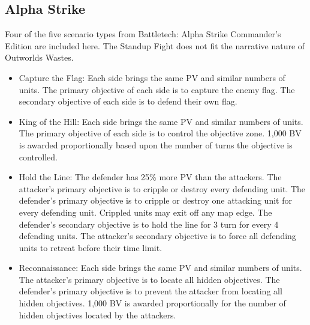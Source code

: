 \documentclass[UTF8]{article}
\begin{document}
\subsection{Alpha Strike}

Four of the five scenario types from Battletech: Alpha Strike Commander's Edition are included here.
The Standup Fight does not fit the narrative nature of Outworlds Wastes.

\begin{itemize}

\item Capture the Flag: Each side brings the same PV and similar numbers of units.
The primary objective of each side is to capture the enemy flag.
The secondary objective of each side is to defend their own flag.

\item King of the Hill: Each side brings the same PV and similar numbers of units.
The primary objective of each side is to control the objective zone.
1,000 BV is awarded proportionally based upon the number of turns the objective is controlled.

\item Hold the Line: The defender has 25\% more PV than the attackers.
The attacker's primary objective is to cripple or destroy every defending unit.
The defender's primary objective is to cripple or destroy one attacking unit for every defending unit.
Crippled units may exit off any map edge.
The defender's secondary objective is to hold the line for 3 turn for every 4 defending units.
The attacker's secondary objective is to force all defending units to retreat before their time limit.

\item Reconnaissance: Each side brings the same PV and similar numbers of units.
The attacker's primary objective is to locate all hidden objectives.
The defender's primary objective is to prevent the attacker from locating all hidden objectives.
1,000 BV is awarded proportionally for the number of hidden objectives located by the attackers.

\end{itemize}
\end{document}
